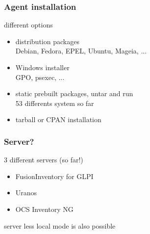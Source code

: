 \begin{frame}
    \frametitle{Agent installation}


    \begin{block}{different options}
        \begin{itemize}
            \item distribution packages \\
            \small{Debian, Fedora, EPEL, Ubuntu, Mageia, ...}
            \item Windows installer \\
            \small{GPO, psexec, ...}
            \item static prebuilt packages, untar and run \\
            \small{53 differents system so far}
            \item tarball or CPAN installation
        \end{itemize}
    \end{block}
\end{frame}




\begin{frame}
    \frametitle{Server?}

    \begin{block}{3 different servers (so far!)}
        \begin{itemize}
            \item FusionInventory for GLPI
            \item Uranos
            \item OCS Inventory NG
        \end{itemize}
    \end{block}

    \pause


    \begin{block}{server less}
        local mode is also possible
    \end{block}
\end{frame}




